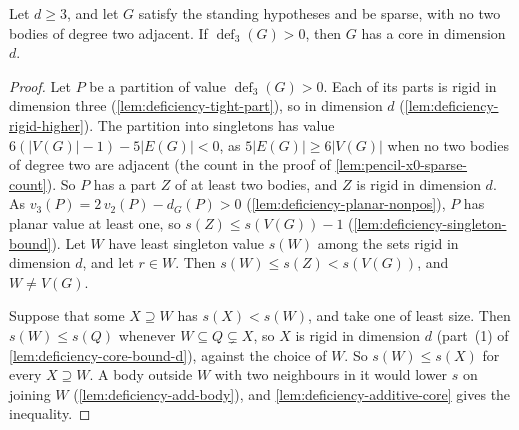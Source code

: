 \begin{lemma}
  \label{lem:pencil-d-core-positive-deficiency}
  \leanok
  Let $d \ge 3$, and let $G$ satisfy the standing hypotheses and be
  sparse, with no two bodies of degree two adjacent. If
  $\operatorname{def}_3(G) > 0$, then $G$ has a core in dimension $d$.
\end{lemma}
\begin{proof}
  \leanok
  Let $P$ be a partition of value $\operatorname{def}_3(G) > 0$. Each of
  its parts is rigid in dimension three
  (\cref{lem:deficiency-tight-part}), so in dimension $d$
  (\cref{lem:deficiency-rigid-higher}). The partition into singletons
  has value $6(|V(G)| - 1) - 5|E(G)| < 0$, as $5|E(G)| \ge 6|V(G)|$ when
  no two bodies of degree two are adjacent (the count in the proof of
  \cref{lem:pencil-x0-sparse-count}). So $P$ has a part $Z$ of at least
  two bodies, and $Z$ is rigid in dimension $d$. As
  $v_3(P) = 2\,v_2(P) - d_G(P) > 0$
  (\cref{lem:deficiency-planar-nonpos}), $P$ has planar value at least
  one, so $s(Z) \le s(V(G)) - 1$ (\cref{lem:deficiency-singleton-bound}).
  Let $W$ have least singleton value $s(W)$ among the sets rigid in
  dimension $d$, and let $r \in W$. Then $s(W) \le s(Z) < s(V(G))$, and
  $W \neq V(G)$.

  Suppose that some $X \supseteq W$ has $s(X) < s(W)$, and take one of
  least size. Then $s(W) \le s(Q)$ whenever $W \subseteq Q \subsetneq X$,
  so $X$ is rigid in dimension $d$ (part~(1) of
  \cref{lem:deficiency-core-bound-d}), against the choice of $W$. So
  $s(W) \le s(X)$ for every $X \supseteq W$. A body outside $W$ with two
  neighbours in it would lower $s$ on joining $W$
  (\cref{lem:deficiency-add-body}), and
  \cref{lem:deficiency-additive-core} gives the inequality.
\end{proof}

